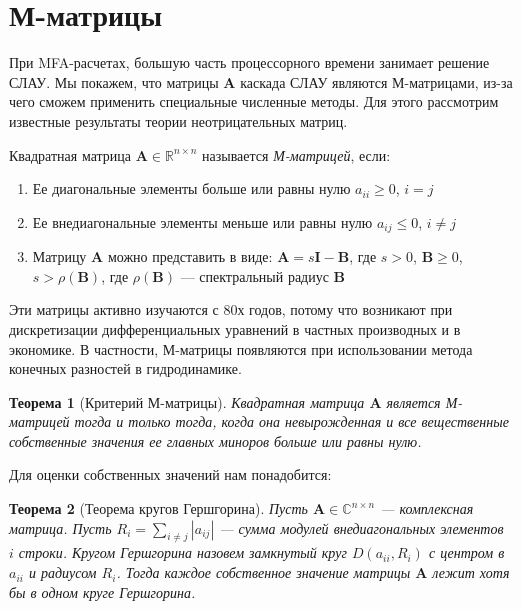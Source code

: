 \documentclass[14pt, a4paper]{extreport}
\begin{document}
\clearpage
\section{М-матрицы}
При MFA-расчетах, большую часть процессорного времени занимает решение СЛАУ. Мы покажем, что матрицы $\mathbf{A}$ каскада СЛАУ являются М-матрицами, из-за чего сможем применить специальные численные методы. Для этого рассмотрим известные результаты теории неотрицательных матриц.

Квадратная матрица $\mathbf{A} \in \mathbb{R}^{n \times n}$ называется \emph{М-матрицей}\cite{m_matrix_orig}, если:
\begin{enumerate}
	\item Ее диагональные элементы больше или равны нулю $a_{ii} \ge 0$, $i = j$
	\item Ее внедиагональные элементы меньше или равны нулю $a_{ij} \le 0$, $i \neq j$
	\item Матрицу $\mathbf{A}$ можно представить в виде: $\mathbf{A} = s\mathbf{I} - \mathbf{B}$, где $s > 0$, $\mathbf{B} \ge 0$, $s > \rho(\mathbf{B})$, где $\rho(\mathbf{B})$ --- спектральный радиус $\mathbf{B}$
\end{enumerate}
Эти матрицы активно изучаются с 80х годов, потому что возникают при дискретизации дифференциальных уравнений в частных производных и в экономике. В частности, М-матрицы появляются при использовании метода конечных разностей в гидродинамике\cite{m_matrix_application_1, m_matrix_application_2,m_matrix_application_3,m_matrix_application_4}.

\newtheorem{theorem}{Теорема}
\begin{theorem}[Критерий М-матрицы\cite{m_matrix_def}]
	\label{m_matrix_criterion}
	Квадратная матрица $\mathbf{A}$ является М-матрицей тогда и только тогда, когда она невырожденная и все вещественные собственные значения ее главных миноров больше или равны нулю. 	
\end{theorem}

Для оценки собственных значений нам понадобится:
\begin{theorem}[Теорема кругов Гершгорина\cite{circle_theorem}]
	\label{circle_theorem}
	Пусть $\mathbf{A} \in \mathbb{C}^{n \times n}$ --- комплексная матрица. Пусть $R_i = \sum_{i \neq j} |a_{ij}|$ --- сумма модулей внедиагональных элементов $i$ строки. Кругом Гершгорина назовем замкнутый круг $D(a_{ii}, R_i)$ с центром в $a_{ii}$ и радиусом $R_i$. Тогда каждое собственное значение матрицы $\mathbf{A}$ лежит хотя бы в одном круге Гершгорина. 
\end{theorem}
\end{document}
